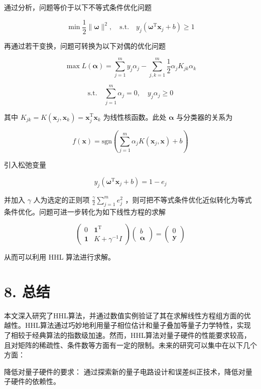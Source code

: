 \documentclass[aps,prl,twocolumn,groupedaddress]{revtex4-2}
\begin{document}
通过分析，问题等价于以下不等式条件优化问题

$$
\min \frac{1 }{2 } \|\pmb{\omega} \|^2,\quad \mathrm{s.t.} \quad y_j\left(\pmb{\omega}^{\mathrm{T}}\pmb{x}_j + b \right)
\geq 1
$$

再通过若干变换，问题可转换为以下对偶的优化问题

$$
\max L(\pmb{\alpha}) = \sum_{j=1}^{m} y_j\alpha_j - \sum_{j,k=1}^{m} \frac{1 }{2 } \alpha_j K_{jk} \alpha_k
$$

$$
\mathrm{s.t.} \quad
\sum_{j=1}^{m}\alpha_j = 0,\quad y_j\alpha_j\geq 0
$$

其中 $K_{jk}=K(\pmb{x}_j,\pmb{x}_k)=\pmb{x}_j^{\mathrm{T}}\pmb{x}_k$ 为线性核函数。此处 $\pmb{\alpha}$ 与分类器的关系为

$$
f(\pmb{x}) = \mathrm{sgn}\left(\sum_{j=1}^{m} \alpha_j K(\pmb{x}_j,\pmb{x}) + b \right)
$$

引入松弛变量

$$
y_j\left(\pmb{\omega}^{\mathrm{T}}\pmb{x}_j+b \right)
=1-e_j
$$

并加入 $\gamma$ 人为选定的正则项 $\displaystyle{\frac{\gamma }{2 } \sum_{j=1}^{m} e_j^2  }$ ，则可把不等式条件优化近似转化为等式条件优化。问题可进一步转化为如下线性方程的求解

$$
\begin{pmatrix}
0 &\pmb{1}^{\mathrm{T}} \\
\pmb{1} &K+\gamma^{-1} I
\end{pmatrix}
\begin{pmatrix}
b \\
\pmb{\alpha}
\end{pmatrix}
=\begin{pmatrix}
0 \\
\pmb{y}
\end{pmatrix}
$$

从而可以利用 HHL 算法进行求解。

\section{8. 总结}

本文深入研究了HHL算法，并通过数值实例验证了其在求解线性方程组方面的优越性。HHL算法通过巧妙地利用量子相位估计和量子叠加等量子力学特性，实现了相较于经典算法的指数级加速。然而，HHL算法对量子硬件的性能要求较高，且对矩阵的稀疏性、条件数等方面有一定的限制。未来的研究可以集中在以下几个方面：

降低对量子硬件的要求： 通过探索新的量子电路设计和误差纠正技术，降低对量子硬件的依赖性。
\end{document}

